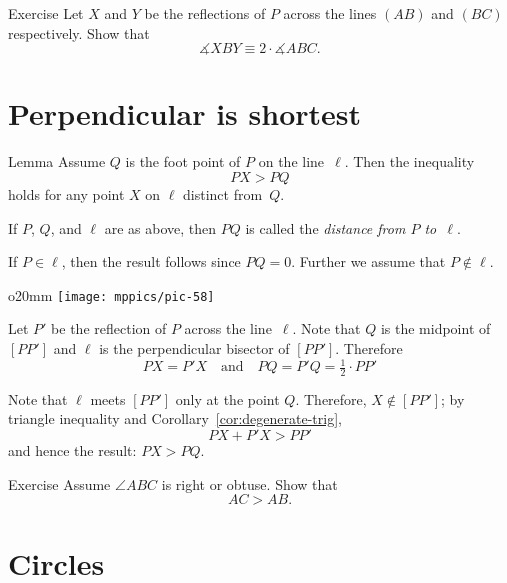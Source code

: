 \begin{thm}{Exercise}\label{ex:2-reflections}
Let $X$ and $Y$ be the reflections of $P$ across the lines $(AB)$ and $(BC)$ respectively.
Show that 
$$\measuredangle XBY\equiv 2\cdot \measuredangle ABC.$$

\end{thm}

\section*{Perpendicular is shortest}

\begin{thm}[\abs]{Lemma}\label{lem:perp<oblique}
Assume $Q$ is the foot point of $P$ on the line~$\ell$.
Then the inequality
$$PX>PQ$$
holds for any point $X$ on $\ell$ distinct from~$Q$. 
\end{thm}

If $P$, $Q$, and $\ell$ are as above, 
then $PQ$ is called the \label{distance!from a point to a line}\emph{distance from $P$ to~$\ell$}. 

If $P\in \ell$, 
then the result follows since $PQ=0$.
Further we assume that $P\notin \ell$.

\begin{wrapfigure}{o}{20mm}
\centering
\texttt{[image: mppics/pic-58]}
\end{wrapfigure}

Let $P'$ be the reflection of $P$ across the line~$\ell$.
Note that $Q$ is the midpoint of $[PP']$
and $\ell$ is the perpendicular bisector of $[PP']$.
Therefore
$$PX=P'X
\quad
\text{and}
\quad
PQ=P'Q=\tfrac12\cdot PP'$$

Note that $\ell$ meets $[PP']$ only at the point $Q$.
Therefore, $X\notin [PP']$; by triangle inequality and Corollary~\ref{cor:degenerate-trig},
$$PX+P'X>PP'$$
and hence the result: $PX>PQ$.
\qeds

\begin{thm}{Exercise}\label{ex:obtuce}
Assume $\angle ABC$ is right or obtuse.
Show that 
\[AC>AB.\]

\end{thm}






\section*{Circles}

